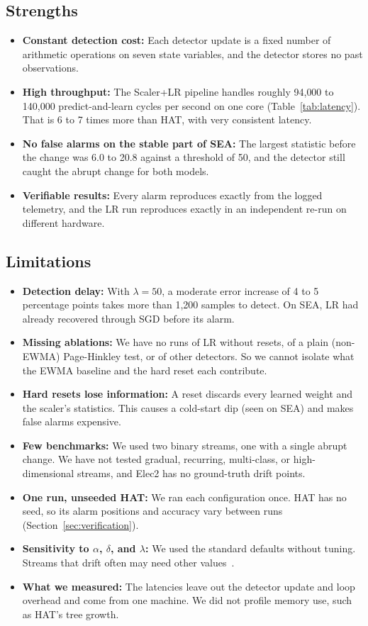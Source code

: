 \documentclass[conference]{IEEEtran}
\begin{document}
\subsection{Strengths}
\begin{itemize}
    \item \textbf{Constant detection cost:} Each detector update is a fixed number of arithmetic operations on seven state variables, and the detector stores no past observations.
    \item \textbf{High throughput:} The Scaler+LR pipeline handles roughly 94{,}000 to 140{,}000 predict-and-learn cycles per second on one core (Table~\ref{tab:latency}). That is 6 to 7 times more than HAT, with very consistent latency.
    \item \textbf{No false alarms on the stable part of SEA:} The largest statistic before the change was 6.0 to 20.8 against a threshold of 50, and the detector still caught the abrupt change for both models.
    \item \textbf{Verifiable results:} Every alarm reproduces exactly from the logged telemetry, and the LR run reproduces exactly in an independent re-run on different hardware.
\end{itemize}

\subsection{Limitations}
\begin{itemize}
    \item \textbf{Detection delay:} With $\lambda = 50$, a moderate error increase of 4 to 5 percentage points takes more than 1{,}200 samples to detect. On SEA, LR had already recovered through SGD before its alarm.
    \item \textbf{Missing ablations:} We have no runs of LR without resets, of a plain (non-EWMA) Page-Hinkley test, or of other detectors. So we cannot isolate what the EWMA baseline and the hard reset each contribute.
    \item \textbf{Hard resets lose information:} A reset discards every learned weight and the scaler's statistics. This causes a cold-start dip (seen on SEA) and makes false alarms expensive.
    \item \textbf{Few benchmarks:} We used two binary streams, one with a single abrupt change. We have not tested gradual, recurring, multi-class, or high-dimensional streams, and Elec2 has no ground-truth drift points.
    \item \textbf{One run, unseeded HAT:} We ran each configuration once. HAT has no seed, so its alarm positions and accuracy vary between runs (Section~\ref{sec:verification}).
    \item \textbf{Sensitivity to $\alpha$, $\delta$, and $\lambda$:} We used the standard defaults without tuning. Streams that drift often may need other values~\cite{rum2026}.
    \item \textbf{What we measured:} The latencies leave out the detector update and loop overhead and come from one machine. We did not profile memory use, such as HAT's tree growth.
\end{itemize}
\end{document}

